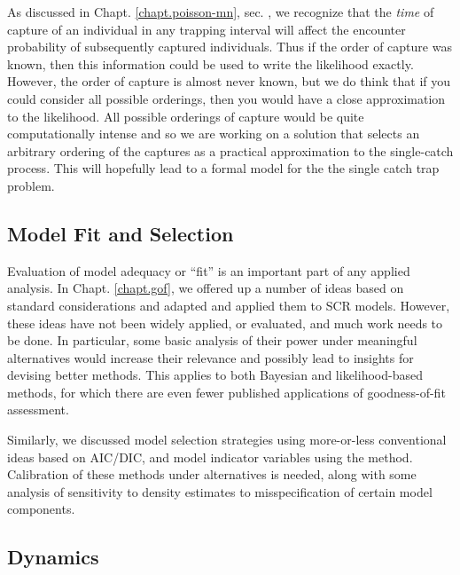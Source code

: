 As discussed in Chapt. \ref{chapt.poisson-mn},
sec. \label{poisson-mn.sec.singlecatch},
we recognize that the {\it time} of capture of an
individual in any trapping interval will affect the encounter
probability of subsequently captured individuals. Thus if
the order of capture was known, then this information could be
used to write the likelihood exactly. However, the order of capture
is almost never known, but we do think that if you could consider all
possible orderings, then you would have a close approximation to the
likelihood. All possible orderings of capture would be quite
computationally intense and so we are working on a solution that selects
an arbitrary ordering of the captures as a practical approximation to the
single-catch process. This will hopefully lead to a formal model
for the the single catch trap problem.


\subsection{Model Fit and Selection}

Evaluation of model adequacy or ``fit'' is an important part of any
applied analysis. In Chapt. \ref{chapt.gof}, we offered up a number of
ideas based on standard considerations and adapted and applied them
to SCR models. However, these ideas have not been widely applied, or
evaluated, and much work needs to be done. In particular, some basic
analysis of their power under meaningful alternatives would increase
their relevance and possibly lead to insights for devising better
methods. This applies to both Bayesian and likelihood-based methods,
for which there are even fewer published applications of
goodness-of-fit assessment.

Similarly, we discussed model selection strategies using more-or-less
conventional ideas based on AIC/DIC, and model indicator variables
using the \citet{kuo_mallick:1998} method. Calibration of these
methods under alternatives is needed, along with some analysis of
sensitivity to density estimates to misspecification of certain model
components.


\subsection{Dynamics}


